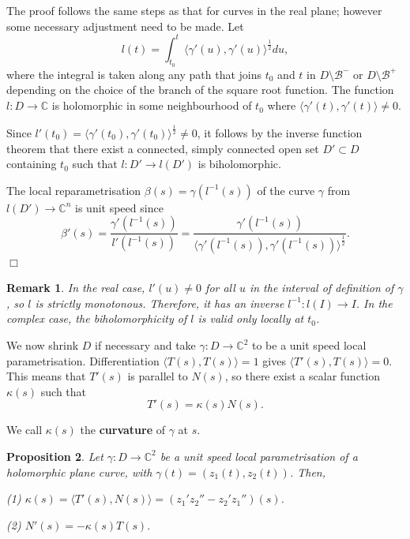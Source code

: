 \documentclass[12pt,a4paper]{article}
\newtheorem{prop}{Proposition}[section]
\newtheorem{rem}[prop]{Remark}
\newenvironment{proof}
{\begin{trivlist} \item[\hskip \labelsep {\bf Proof}\hspace*{3 mm}]}
	{\hfill$\Box$\end{trivlist}}
\begin{document}
\begin{proof}
The proof follows the same steps as that for curves in the real plane; however some necessary adjustment need to be made. Let 
$$
l(t)=\int_{t_0}^t \langle \gamma'(u), {\gamma'(u)}\rangle^\frac12 du,
$$
where the integral is taken along any path that joins $t_0$ and $t$ in $D\setminus \mathcal{B}^-$ or $D\setminus \mathcal{B}^+$ depending on the choice of the branch of the square root function. 
The function $l:D\to \mathbb C$ 
is holomorphic in some neighbourhood of $t_0$ where $\langle \gamma'(t), {\gamma'(t)}\rangle \ne 0$.

Since $l'(t_0)=\langle \gamma'(t_0), {\gamma'(t_0)}\rangle^{\frac 12} \ne 0$, it follows by the inverse function theorem that there exist a connected, simply connected open set $D'\subset D$ containing $t_0$ such that 
$l:D'\to l(D')$ is biholomorphic.

The local reparametrisation $\beta(s)=\gamma(l^{-1}(s))$ of the curve $\gamma$ from $l(D')\to \mathbb C^n$ is
unit speed since 
$$
\beta'(s)=\frac{\gamma'(l^{-1}(s))}{l'(l^{-1}(s))}=\frac{\gamma'(l^{-1}(s))}{\langle \gamma'(l^{-1}(s)), {\gamma'(l^{-1}(s))}\rangle^\frac12}.
$$
\end{proof}

\begin{rem}
{\rm In the real case, $l'(u)\ne 0$ for all $u$ in the interval of definition of $\gamma$, so $l$ is strictly monotonous. Therefore, it has an inverse $l^{-1}: l(I)\to I$. In the complex case, the biholomorphicity of $l$ is valid only locally at $t_0$.
}
\end{rem}

We now shrink $D$ if necessary and take $\gamma:D\to \mathbb C^2$ to be a unit speed local parametrisation. Differentiation $\langle T(s), {T(s)}\rangle=1$ gives $\langle T'(s), {T(s)}\rangle=0$. This means that $T'(s)$ is parallel to $N(s)$, so there exist a scalar function $\kappa(s)$ such that 
$$
T'(s)=\kappa(s)N(s).
$$

We call $\kappa(s)$ the {\bf curvature} of $\gamma$ at $s$.

\begin{prop}\label{prop:SeretFrenetPlabnecurves}
Let $\gamma:D\to \mathbb C^2$ be a unit speed local parametrisation of a holomorphic plane curve, with $\gamma(t)=(z_1(t),z_2(t))$. Then,
 
{\rm (1)} $\kappa(s)=\langle T'(s), {N(s)}\rangle=(z_1'z_2''-z_2'z_1'')(s)$.

{\rm (2)} $N'(s)=-\kappa(s)T(s).$
\end{prop}
\end{document}
